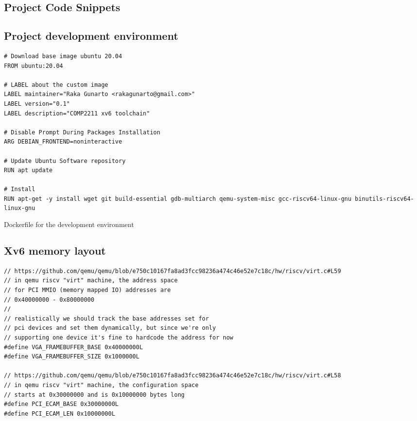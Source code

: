 \begin{appendices}
%
%

\chapter{Project Code Snippets}
\section{Project development environment}
\label{appendix:c:1}
\begin{listing}[H]
    \begin{verbatim}
# Download base image ubuntu 20.04
FROM ubuntu:20.04

# LABEL about the custom image
LABEL maintainer="Raka Gunarto <rakagunarto@gmail.com>"
LABEL version="0.1"
LABEL description="COMP2211 xv6 toolchain"

# Disable Prompt During Packages Installation
ARG DEBIAN_FRONTEND=noninteractive

# Update Ubuntu Software repository
RUN apt update

# Install
RUN apt-get -y install wget git build-essential gdb-multiarch qemu-system-misc gcc-riscv64-linux-gnu binutils-riscv64-linux-gnu
    \end{verbatim}
    \caption{Dockerfile for the development environment}
\end{listing}
\section{Xv6 memory layout}
\label{appendix:c:2}
\begin{listing}[H]
\begin{verbatim}
// https://github.com/qemu/qemu/blob/e750c10167fa8ad3fcc98236a474c46e52e7c18c/hw/riscv/virt.c#L59
// in qemu riscv "virt" machine, the address space
// for PCI MMIO (memory mapped IO) addresses are
// 0x40000000 - 0x80000000
//
// realistically we should track the base addresses set for
// pci devices and set them dynamically, but since we're only
// supporting one device it's fine to hardcode the address for now
#define VGA_FRAMEBUFFER_BASE 0x40000000L
#define VGA_FRAMEBUFFER_SIZE 0x1000000L

// https://github.com/qemu/qemu/blob/e750c10167fa8ad3fcc98236a474c46e52e7c18c/hw/riscv/virt.c#L58
// in qemu riscv "virt" machine, the configuration space
// starts at 0x30000000 and is 0x10000000 bytes long
#define PCI_ECAM_BASE 0x30000000L
#define PCI_ECAM_LEN 0x10000000L


\end{verbatim}
\end{listing}
\end{appendices}
